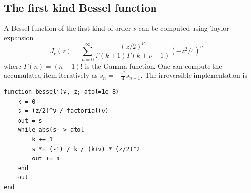 \documentclass{article}
\newcommand{\<}{\langle}
\renewcommand{\>}{\rangle}
\theoremstyle{definition}\newtheorem{definition}{\textit{Definition}}
\begin{document}
\subsection{The first kind Bessel function}\label{sec:bessel}
A Bessel function of the first kind of order $\nu$ can be computed using Taylor expansion
\begin{equation}
    J_\nu(z) = \sum\limits_{n=0}^{\infty} \frac{(z/2)^\nu}{\Gamma(k+1)\Gamma(k+\nu+1)} (-z^2/4)^{n}
\end{equation}
where $\Gamma(n) = (n-1)!$ is the Gamma function. One can compute the accumulated item iteratively as $s_n = -\frac{z^2}{4} s_{n-1}$. The irreversible implementation is

\begin{minipage}{.88\columnwidth}
\begin{lstlisting}
function besselj(ν, z; atol=1e-8)
    k = 0
    s = (z/2)^ν / factorial(ν)
    out = s
    while abs(s) > atol
        k += 1
        s *= (-1) / k / (k+ν) * (z/2)^2
        out += s
    end
    out
end
\end{lstlisting}
\end{minipage}
\end{document}
